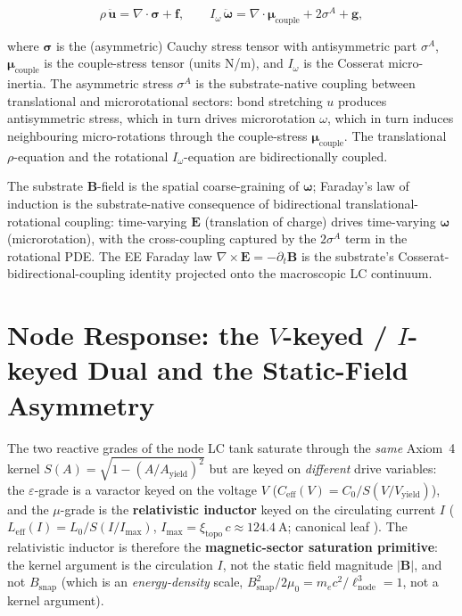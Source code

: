 \[
\rho\, \ddot{\mathbf{u}} = \nabla \cdot \boldsymbol{\sigma} + \mathbf{f},
\qquad
I_\omega\, \ddot{\boldsymbol{\omega}} = \nabla \cdot \boldsymbol{\mu}_{\text{couple}} + 2\sigma^A + \mathbf{g},
\]

where $\boldsymbol{\sigma}$ is the (asymmetric) Cauchy stress tensor with antisymmetric part $\sigma^A$, $\boldsymbol{\mu}_{\text{couple}}$ is the couple-stress tensor (units N/m), and $I_\omega$ is the Cosserat micro-inertia. The asymmetric stress $\sigma^A$ is the substrate-native coupling between translational and microrotational sectors: bond stretching $u$ produces antisymmetric stress, which in turn drives microrotation $\omega$, which in turn induces neighbouring micro-rotations through the couple-stress $\boldsymbol{\mu}_{\text{couple}}$. The translational $\rho$-equation and the rotational $I_\omega$-equation are bidirectionally coupled.

The substrate $\mathbf{B}$-field is the spatial coarse-graining of $\boldsymbol{\omega}$; Faraday's law of induction is the substrate-native consequence of bidirectional translational-rotational coupling: time-varying $\mathbf{E}$ (translation of charge) drives time-varying $\boldsymbol{\omega}$ (microrotation), with the cross-coupling captured by the $2\sigma^A$ term in the rotational PDE. The EE Faraday law $\nabla \times \mathbf{E} = -\partial_t \mathbf{B}$ is the substrate's Cosserat-bidirectional-coupling identity projected onto the macroscopic LC continuum.

\section{Node Response: the $V$-keyed / $I$-keyed Dual and the Static-Field Asymmetry}
\label{sec:vol9_node_response_dual}

The two reactive grades of the node LC tank saturate through the \emph{same} Axiom~4 kernel $S(A) = \sqrt{1 - (A/A_{\mathrm{yield}})^2}$ but are keyed on \emph{different} drive variables: the $\varepsilon$-grade is a varactor keyed on the voltage $V$ ($C_{\mathrm{eff}}(V) = C_0/S(V/V_{\mathrm{yield}})$), and the $\mu$-grade is the \textbf{relativistic inductor} keyed on the circulating current $I$ ($L_{\mathrm{eff}}(I) = L_0/S(I/I_{\mathrm{max}})$, $I_{\mathrm{max}} = \xi_{\mathrm{topo}}\, c \approx \qty{124.4}{\ampere}$; canonical leaf ). The relativistic inductor is therefore the \textbf{magnetic-sector saturation primitive}: the kernel argument is the circulation $I$, not the static field magnitude $|\mathbf B|$, and not $B_{\mathrm{snap}}$ (which is an \emph{energy-density} scale, $B_{\mathrm{snap}}^2/2\mu_0 = m_e c^2/\ell_{\mathrm{node}}^3 = 1$, not a kernel argument).

